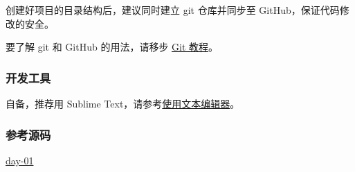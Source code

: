 创建好项目的目录结构后，建议同时建立 git 仓库并同步至
GitHub，保证代码修改的安全。

要了解 git 和 GitHub 的用法，请移步
\href{http://www.liaoxuefeng.com/wiki/896043488029600}{Git 教程}。

\hypertarget{ux5f00ux53d1ux5de5ux5177}{%
\subsubsection{开发工具}\label{ux5f00ux53d1ux5de5ux5177}}

自备，推荐用 Sublime
Text，请参考\href{https://www.liaoxuefeng.com/wiki/1016959663602400/1017024645952992}{使用文本编辑器}。

\hypertarget{ux53c2ux8003ux6e90ux7801}{%
\subsubsection{参考源码}\label{ux53c2ux8003ux6e90ux7801}}

\href{https://github.com/michaelliao/awesome-python3-webapp/tree/day-01}{day-01}

